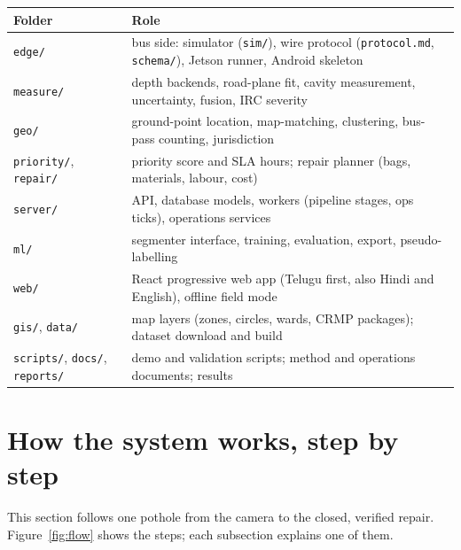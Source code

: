 \documentclass[11pt,a4paper]{article}
\newcommand{\code}[1]{\texttt{\small #1}}
\begin{document}
\begin{center}
\begin{tabularx}{\textwidth}{@{}>{\raggedright\arraybackslash}p{36mm} X@{}}
\toprule
\textbf{Folder} & \textbf{Role}\\
\midrule
\code{edge/} & bus side: simulator (\code{sim/}), wire protocol (\code{protocol.md}, \code{schema/}), Jetson runner, Android skeleton\\
\code{measure/} & depth backends, road-plane fit, cavity measurement, uncertainty, fusion, IRC severity\\
\code{geo/} & ground-point location, map-matching, clustering, bus-pass counting, jurisdiction\\
\code{priority/}, \code{repair/} & priority score and SLA hours; repair planner (bags, materials, labour, cost)\\
\code{server/} & API, database models, workers (pipeline stages, ops ticks), operations services\\
\code{ml/} & segmenter interface, training, evaluation, export, pseudo-labelling\\
\code{web/} & React progressive web app (Telugu first, also Hindi and English), offline field mode\\
\code{gis/}, \code{data/} & map layers (zones, circles, wards, CRMP packages); dataset download and build\\
\code{scripts/}, \code{docs/}, \code{reports/} & demo and validation scripts; method and operations documents; results\\
\bottomrule
\end{tabularx}
\end{center}

\section{How the system works, step by step}\label{sec:steps}

This section follows one pothole from the camera to the closed, verified repair. Figure~\ref{fig:flow} shows the
steps; each subsection explains one of them.
\end{document}
